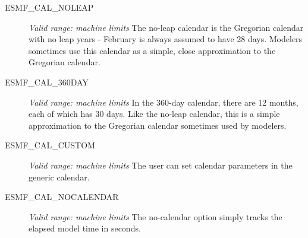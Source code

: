 \begin{description}
\item[ESMF\_CAL\_NOLEAP]
{\it Valid range: machine limits} \newline
The no-leap calendar is the Gregorian calendar with no leap years - 
February is always assumed to have 28 days.  Modelers sometimes use this 
calendar as a simple, close approximation to the Gregorian calendar.

\item[ESMF\_CAL\_360DAY]
{\it Valid range: machine limits} \newline
In the 360-day calendar, there are 12 months, each of which has 30 days.  
Like the no-leap calendar, this is a simple approximation to the Gregorian
calendar sometimes used by modelers.

\item[ESMF\_CAL\_CUSTOM] 
{\it Valid range: machine limits} \newline 
The user can set calendar parameters in the generic calendar.

\item[ESMF\_CAL\_NOCALENDAR]
{\it Valid range: machine limits} \newline 
The no-calendar option simply tracks the elapsed model time in seconds.

\end{description}





